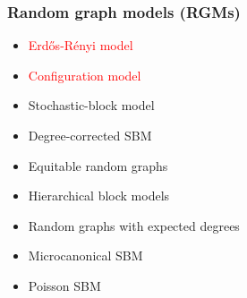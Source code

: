 \documentclass{beamer}
\begin{document}
\begin{frame}
    \frametitle{Random graph models (RGMs)}
    \centering
    \begin{itemize}
    \setlength\itemsep{1em}
        \item{\textcolor{red}{Erd{\H o}s-R{\'e}nyi model}}
        \item{\textcolor{red}{Configuration model}}
        \item{Stochastic-block model}
        \item{Degree-corrected SBM}
        \item{Equitable random graphs}
        \item{Hierarchical block models}
        \item{Random graphs with expected degrees}
        \item{Microcanonical SBM}
        \item{Poisson SBM}
    \end{itemize}
\end{frame}
\end{document}
